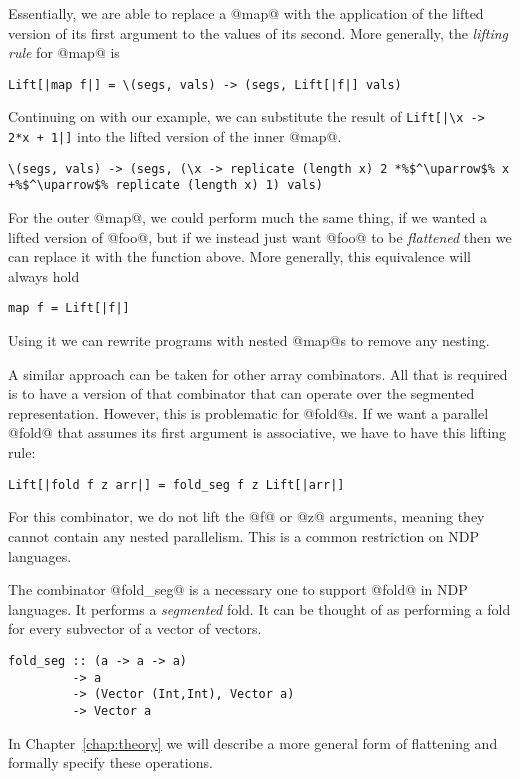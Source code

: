 %
Essentially, we are able to replace a @map@ with the application of the lifted version of its first argument to the values of its second. More generally, the \emph{lifting rule} for @map@ is
%
\begin{lstlisting}[style=ndp]
Lift[|map f|] = \(segs, vals) -> (segs, Lift[|f|] vals)
\end{lstlisting}
%
Continuing on with our example, we can substitute the result of \lstinline[style=ndp]{Lift[|\x -> 2*x + 1|]} into the lifted version of the inner @map@.
%
\begin{lstlisting}
\(segs, vals) -> (segs, (\x -> replicate (length x) 2 *%$^\uparrow$% x +%$^\uparrow$% replicate (length x) 1) vals)
\end{lstlisting}
%
For the outer @map@, we could perform much the same thing, if we wanted a lifted version of @foo@, but if we instead just want @foo@ to be \emph{flattened} then we can replace it with the function above. More generally, this equivalence will always hold
%
\begin{lstlisting}[style=ndp]
map f = Lift[|f|]
\end{lstlisting}
%
Using it we can rewrite programs with nested @map@s to remove any nesting.

A similar approach can be taken for other array combinators. All that is required is to have a version of that combinator that can operate over the segmented representation. However, this is problematic for @fold@s. If we want a  parallel @fold@ that assumes its first argument is associative, we have to have this lifting rule:
%
\begin{lstlisting}[style=ndp]
Lift[|fold f z arr|] = fold_seg f z Lift[|arr|]
\end{lstlisting}
%
For this combinator, we do not lift the @f@ or @z@ arguments, meaning they cannot contain any nested parallelism. This is a common restriction on NDP languages.

The combinator @fold_seg@ is a necessary one to support @fold@ in NDP languages. It performs a \emph{segmented} fold. It can be thought of as performing a fold for every subvector of a vector of vectors.
%
\begin{lstlisting}[style=ndp]
fold_seg :: (a -> a -> a)
         -> a
         -> (Vector (Int,Int), Vector a)
         -> Vector a
\end{lstlisting}
%

In Chapter~\ref{chap:theory} we will describe a more general form of flattening and formally specify these operations.
%

